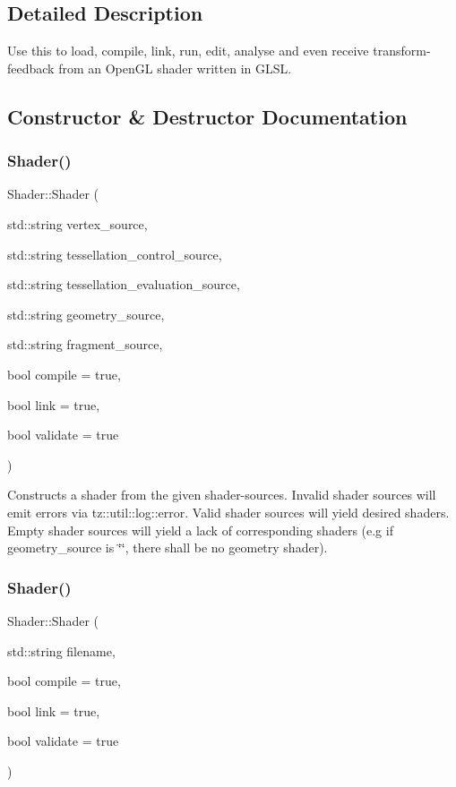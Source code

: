 \subsection{Detailed Description}
Use this to load, compile, link, run, edit, analyse and even receive transform-\/feedback from an Open\+GL shader written in G\+L\+SL. 

\subsection{Constructor \& Destructor Documentation}
\mbox{\label{class_shader_ad70a8439144aba347eea228df7a3357b}} 
\subsubsection{\texorpdfstring{Shader()}{Shader()}\hspace{0.1cm}{\footnotesize\ttfamily [1/2]}}
{\footnotesize\ttfamily Shader\+::\+Shader (\begin{DoxyParamCaption}\item[{std\+::string}]{vertex\+\_\+source,  }\item[{std\+::string}]{tessellation\+\_\+control\+\_\+source,  }\item[{std\+::string}]{tessellation\+\_\+evaluation\+\_\+source,  }\item[{std\+::string}]{geometry\+\_\+source,  }\item[{std\+::string}]{fragment\+\_\+source,  }\item[{bool}]{compile = {\ttfamily true},  }\item[{bool}]{link = {\ttfamily true},  }\item[{bool}]{validate = {\ttfamily true} }\end{DoxyParamCaption})}

Constructs a shader from the given shader-\/sources. Invalid shader sources will emit errors via tz\+::util\+::log\+::error. Valid shader sources will yield desired shaders. Empty shader sources will yield a lack of corresponding shaders (e.\+g if geometry\+\_\+source is \char`\"{}\char`\"{}, there shall be no geometry shader). \mbox{\label{class_shader_adecfdceb03c6d56bbba99e9f49855a4a}} 
\subsubsection{\texorpdfstring{Shader()}{Shader()}\hspace{0.1cm}{\footnotesize\ttfamily [2/2]}}
{\footnotesize\ttfamily Shader\+::\+Shader (\begin{DoxyParamCaption}\item[{std\+::string}]{filename,  }\item[{bool}]{compile = {\ttfamily true},  }\item[{bool}]{link = {\ttfamily true},  }\item[{bool}]{validate = {\ttfamily true} }\end{DoxyParamCaption})}

